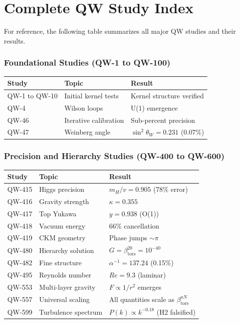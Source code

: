 \documentclass[11pt,a4paper]{book}
\theoremstyle{remark}
\newcommand{\betators}{\beta_{\text{tors}}}
\begin{document}
\part{Complete QW Study Index}

For reference, the following table summarizes all major QW studies and their results.

\section{Foundational Studies (QW-1 to QW-100)}

\begin{center}
\begin{longtable}{|l|l|l|}
\hline
\textbf{Study} & \textbf{Topic} & \textbf{Result} \\
\hline
QW-1 to QW-10 & Initial kernel tests & Kernel structure verified \\
QW-4 & Wilson loops & U(1) emergence \\
QW-46 & Iterative calibration & Sub-percent precision \\
QW-47 & Weinberg angle & $\sin^2\theta_W = 0.231$ (0.07\%) \\
\hline
\end{longtable}
\end{center}

\section{Precision and Hierarchy Studies (QW-400 to QW-600)}

\begin{center}
\begin{longtable}{|l|l|l|}
\hline
\textbf{Study} & \textbf{Topic} & \textbf{Result} \\
\hline
QW-415 & Higgs precision & $m_H/v = 0.905$ (78\% error) \\
QW-416 & Gravity strength & $\kappa = 0.355$ \\
QW-417 & Top Yukawa & $y = 0.938$ (O(1)) \\
QW-418 & Vacuum energy & 66\% cancellation \\
QW-419 & CKM geometry & Phase jumps $\sim \pi$ \\
QW-480 & Hierarchy solution & $G = \betators^{20} = 10^{-40}$ \\
QW-482 & Fine structure & $\alpha^{-1} = 137.24$ (0.15\%) \\
QW-495 & Reynolds number & $Re = 9.3$ (laminar) \\
QW-553 & Multi-layer gravity & $F \propto 1/r^2$ emerges \\
QW-557 & Universal scaling & All quantities scale as $\betators^{aN}$ \\
QW-599 & Turbulence spectrum & $P(k) \propto k^{-0.18}$ (H2 falsified) \\
\hline
\end{longtable}
\end{center}
\end{document}
